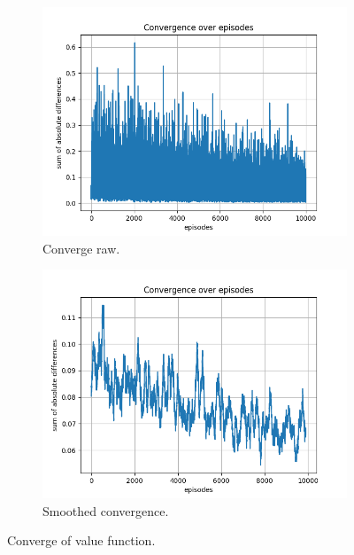 \documentclass{assignment}
\begin{document}
\begin{figure}[H]
    \begin{subfigure}{0.5\textwidth}
        \includegraphics[width=\textwidth]{figures/convergence_q/alpha_sweep/convergence_Q_alpha_0.001_gamma_0.95_epislon_0.2.png}
    \caption{Converge raw.}
    \end{subfigure}\hfill
    \begin{subfigure}{0.5\textwidth}
        \includegraphics[width=\textwidth]{figures/convergence_q/alpha_sweep/convergence_Q_smoothed_alpha_0.001_gamma_0.95_epislon_0.2.png}
    \caption{Smoothed convergence.}
    \end{subfigure}
    \caption{Converge of value function.}
    \label{fig:alpha_0.001_q_learning_convergence}
\end{figure}
\end{document}
